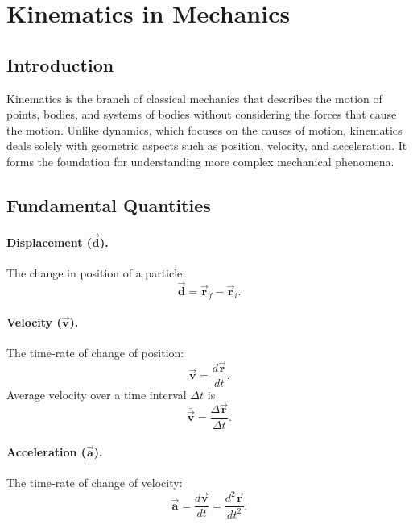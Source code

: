 \documentclass{article}
\begin{document}

\tableofcontents
\newpage

\section{Kinematics in Mechanics}

\subsection{Introduction}
Kinematics is the branch of classical mechanics that describes the motion of points, bodies, and systems of bodies without considering the forces that cause the motion.  Unlike dynamics, which focuses on the causes of motion, kinematics deals solely with geometric aspects such as position, velocity, and acceleration.  It forms the foundation for understanding more complex mechanical phenomena.

\subsection{Fundamental Quantities}

\paragraph{Displacement (\(\vec{\mathbf{d}}\)).} The change in position of a particle:
\begin{equation}
\vec{\mathbf{d}} = \vec{\mathbf{r}}_{\!f} - \vec{\mathbf{r}}_{\!i}.
\end{equation}

\paragraph{Velocity (\(\vec{\mathbf{v}}\)).} The time‑rate of change of position:
\begin{equation}
\vec{\mathbf{v}} = \frac{d\vec{\mathbf{r}}}{dt}.
\end{equation}
Average velocity over a time interval \(\Delta t\) is
\begin{equation}
\bar{\vec{\mathbf{v}}}=\frac{\Delta\vec{\mathbf{r}}}{\Delta t}.
\end{equation}

\paragraph{Acceleration (\(\vec{\mathbf{a}}\)).} The time‑rate of change of velocity:
\begin{equation}
\vec{\mathbf{a}} = \frac{d\vec{\mathbf{v}}}{dt} = \frac{d^{2}\vec{\mathbf{r}}}{dt^{2}}.
\end{equation}
\end{document}
